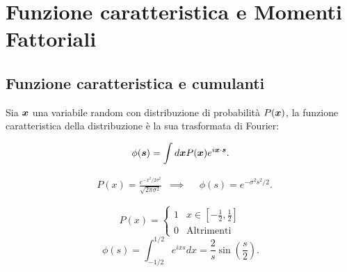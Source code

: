 \section{Funzione caratteristica e Momenti Fattoriali}%
\label{sub:Lezione 3}
\mylocaltoc
\subsection{Funzione caratteristica e cumulanti}%
\label{sub:Funzione caratteristica}
Sia $\boldsymbol{x}$ una variabile random con distribuzione di probabilità $P(\boldsymbol{x})$, la funzione caratteristica della distribuzione è la sua trasformata di Fourier:
\begin{redbox}{}
    \[
	\phi (\boldsymbol{s}) = \int d\boldsymbol{x} P(\boldsymbol{x}) e^{i \boldsymbol{x}\cdot \boldsymbol{s}}
    .\] 
\end{redbox}

\begin{exmp}
 \[\begin{aligned}
    &P(x) = \frac{e^{-x^2 / 2 \sigma^2}}{\sqrt{2\pi\sigma^2}} 
    &\implies&
    &\phi (s) = e^{-\sigma^2s^2 / 2}
.\end{aligned}\]
\end{exmp}

\begin{exmp}
\[
    P(x) = 
    \begin{cases}
	1 & x \in \left[-\frac{1}{2}, \frac{1}{2}\right]\\
	0 & \text{Altrimenti}
    \end{cases}
\] 
\[
    \phi (s) = \int_{-1 /2}^{1 /2} e^{ixs}dx = \frac{2}{s}\sin\left(\frac{s}{2}\right)  
.\] 
\end{exmp}

